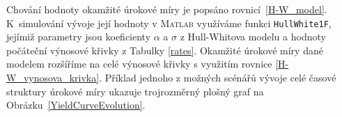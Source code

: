 \documentclass[a4paper,12pt]{report}
\theoremstyle{definition} \newtheorem{definice}[veta]{Definice}
\theoremstyle{remark}
\newcommand{\MATLAB}{\textsc{Matlab}\xspace}
\begin{document}
Chování hodnoty okamžité úrokové míry je popsáno rovnicí~\eqref{H-W_model}.
K~simulování vývoje její hodnoty v \MATLAB využíváme funkci \verb+HullWhite1F+, jejímiž parametry jsou koeficienty $\alpha$ a $\sigma$ z Hull-Whitova modelu a hodnoty počáteční výnosové křivky z Tabulky \ref{rates}.  
Okamžité úrokové míry dané modelem rozšíříme na celé výnosové křivky s využitím rovnice \eqref{H-W_vynosova_krivka}.
Příklad jednoho z možných scénářů vývoje celé časové struktury úrokové míry ukazuje trojrozměrný plošný graf na Obrázku~\ref{YieldCurveEvolution}.
\end{document}
